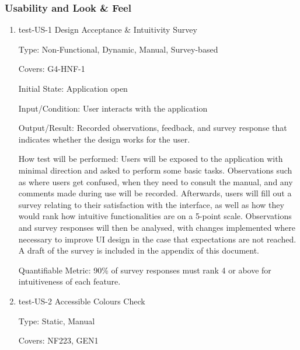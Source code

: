 \documentclass[12pt, titlepage]{article}
\begin{document}

\fi
\subsubsection{Usability and Look \& Feel}

\begin{enumerate}

\item{test-US-1 Design Acceptance \& Intuitivity Survey\\}

Type: Non-Functional, Dynamic, Manual, Survey-based

Covers: G4-HNF-1
					
Initial State: Application open
					
Input/Condition: User interacts with the application
					
Output/Result: Recorded observations, feedback, and survey response that indicates whether the design works for the user.
					
How test will be performed: Users will be exposed to the application with minimal direction and asked to perform 
some basic tasks. Observations such as where users get confused, when they need to consult the manual, and any comments
made during use will be recorded. Afterwards, users will fill out a survey relating to their satisfaction with the interface, 
as well as how they would rank how intuitive functionalities are on a 5-point scale. Observations and survey responses will then be analysed, with
changes implemented where necessary to improve UI design in the case that expectations are not reached. A draft of the survey
is included in the appendix of this document.

Quantifiable Metric: 90\% of survey responses must rank 4 or above for intuitiveness of each feature.

\item{test-US-2 Accessible Colours Check\\}

Type: Static, Manual

Covers: NF223, GEN1 %
					

\end{enumerate}
\end{document}
